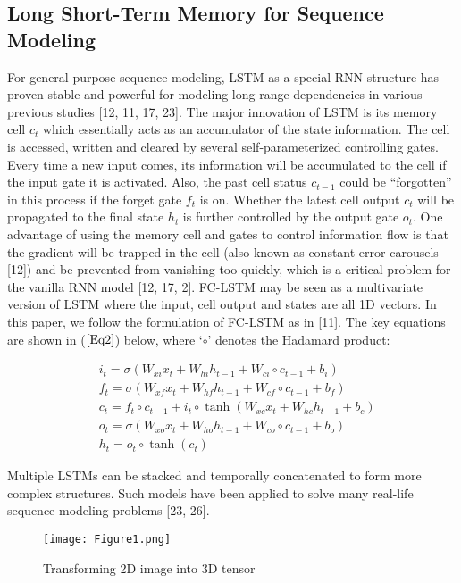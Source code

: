 \subsection{Long Short-Term Memory for Sequence Modeling}
\par For general-purpose sequence modeling, LSTM as a special RNN structure has proven stable and powerful for modeling long-range dependencies in various previous studies [12, 11, 17, 23]. The major innovation of LSTM is its memory cell $c_t$ which essentially acts as an accumulator of the state information. The cell is accessed, written and cleared by several self-parameterized controlling gates. Every time a new input comes, its information will be accumulated to the cell if the input gate it is activated. Also, the past cell status $c_{t-1}$ could be “forgotten” in this process if the forget gate $f_t$ is on. Whether the latest cell output $c_t$ will be propagated to the final state $h_t$ is further controlled by the output gate $o_t$. One advantage of using the memory cell and gates to control information flow is that the gradient will be trapped in the cell (also known as constant error carousels [12]) and be prevented from vanishing too quickly, which is a critical problem for the vanilla RNN model [12, 17, 2]. FC-LSTM may be seen as a multivariate version of LSTM where the input, cell output and states are all 1D vectors. In this paper, we follow the formulation of FC-LSTM as in [11]. The key equations are shown in ($\ref{Eq2}$) below, where ‘$\circ$’ denotes the Hadamard product:

\begin{equation}
  \begin{split}
    & i_t=\sigma(W_{xi}x_t+W_{hi}h_{t-1}+W_{ci}\circ c_{t-1}+b_i)\\
    & f_t=\sigma(W_{xf}x_t+W_{hf}h_{t-1}+W_{cf}\circ c_{t-1}+b_f)\\
    & c_t=f_t\circ c_{t-1}+i_t\circ \tanh(W_{xc}x_t+W_{hc}h_{t-1}+b_c)\\
    & o_t=\sigma(W_{xo}x_t+W_{ho}h_{t-1}+W_{co}\circ c_{t-1}+b_o)\\
    & h_t=o_t\circ \tanh(c_t)\label{Eq2}
  \end{split}
\end{equation}

\par Multiple LSTMs can be stacked and temporally concatenated to form more complex structures. Such models have been applied to solve many real-life sequence modeling problems [23, 26].

\begin{figure}
  \begin{center}
    \texttt{[image: Figure1.png]}
    \caption{Transforming 2D image into 3D tensor}
    \label{Fig1}
  \end{center}
\end{figure}